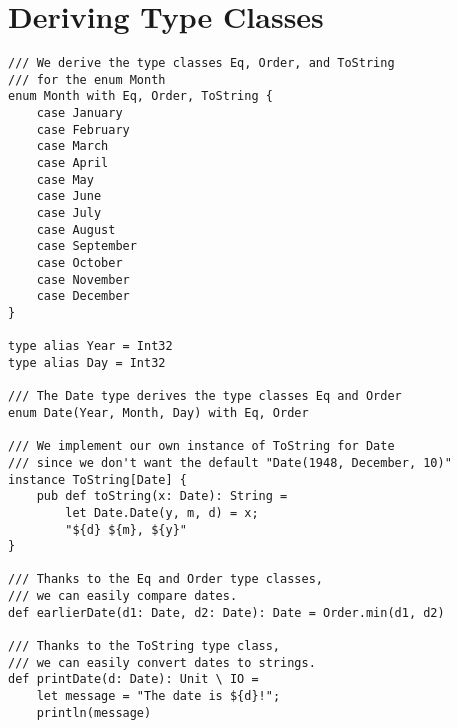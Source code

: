 \documentclass{article}
\begin{document}
\section{Deriving Type Classes}
\begin{lstlisting}
/// We derive the type classes Eq, Order, and ToString
/// for the enum Month
enum Month with Eq, Order, ToString {
    case January
    case February
    case March
    case April
    case May
    case June
    case July
    case August
    case September
    case October
    case November
    case December
}

type alias Year = Int32
type alias Day = Int32

/// The Date type derives the type classes Eq and Order
enum Date(Year, Month, Day) with Eq, Order

/// We implement our own instance of ToString for Date
/// since we don't want the default "Date(1948, December, 10)"
instance ToString[Date] {
    pub def toString(x: Date): String =
        let Date.Date(y, m, d) = x;
        "${d} ${m}, ${y}"
}

/// Thanks to the Eq and Order type classes,
/// we can easily compare dates.
def earlierDate(d1: Date, d2: Date): Date = Order.min(d1, d2)

/// Thanks to the ToString type class,
/// we can easily convert dates to strings.
def printDate(d: Date): Unit \ IO =
    let message = "The date is ${d}!";
    println(message)
\end{lstlisting}
\end{document}
